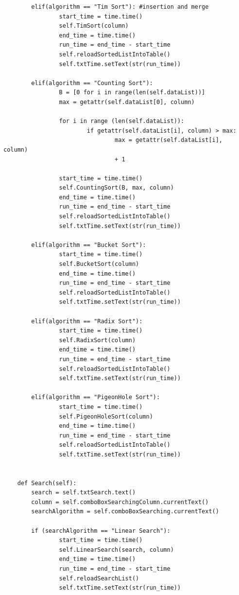 \documentclass[12pt]{article}
\begin{document}
\begin{verbatim}
        elif(algorithm == "Tim Sort"): #insertion and merge
                start_time = time.time()
                self.TimSort(column)
                end_time = time.time()
                run_time = end_time - start_time
                self.reloadSortedListIntoTable()
                self.txtTime.setText(str(run_time))
        
        elif(algorithm == "Counting Sort"):
                B = [0 for i in range(len(self.dataList))]
                max = getattr(self.dataList[0], column)

                for i in range (len(self.dataList)):
                        if getattr(self.dataList[i], column) > max:
                                max = getattr(self.dataList[i], column)
                                + 1 

                start_time = time.time()
                self.CountingSort(B, max, column)
                end_time = time.time()
                run_time = end_time - start_time
                self.reloadSortedListIntoTable()
                self.txtTime.setText(str(run_time))

        elif(algorithm == "Bucket Sort"):
                start_time = time.time()
                self.BucketSort(column)
                end_time = time.time()
                run_time = end_time - start_time
                self.reloadSortedListIntoTable()
                self.txtTime.setText(str(run_time))

        elif(algorithm == "Radix Sort"):
                start_time = time.time()
                self.RadixSort(column)
                end_time = time.time()
                run_time = end_time - start_time
                self.reloadSortedListIntoTable()
                self.txtTime.setText(str(run_time))

        elif(algorithm == "PigeonHole Sort"): 
                start_time = time.time()
                self.PigeonHoleSort(column)
                end_time = time.time()
                run_time = end_time - start_time
                self.reloadSortedListIntoTable()
                self.txtTime.setText(str(run_time))


    def Search(self):
        search = self.txtSearch.text()
        column = self.comboBoxSearchingColumn.currentText()
        searchAlgorithm = self.comboBoxSearching.currentText()

        if (searchAlgorithm == "Linear Search"):
                start_time = time.time()
                self.LinearSearch(search, column)
                end_time = time.time()
                run_time = end_time - start_time
                self.reloadSearchList()
                self.txtTime.setText(str(run_time))


\end{verbatim}
\end{document}
